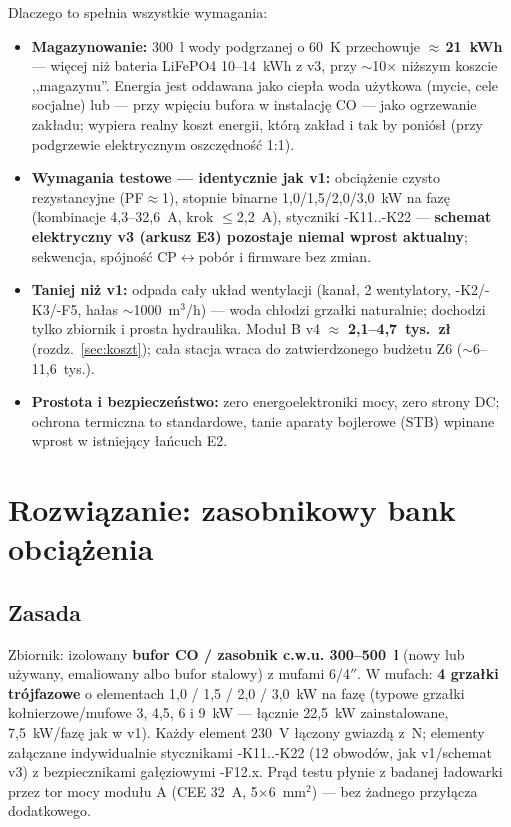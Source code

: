 \documentclass[11pt,a4paper]{article}
\begin{document}
Dlaczego to spełnia wszystkie wymagania:
\begin{itemize}
\item \textbf{Magazynowanie:} 300~l wody podgrzanej o 60~K przechowuje $\approx$\,\textbf{21~kWh}
--- więcej niż bateria LiFePO4 10--14~kWh z v3, przy $\sim$10$\times$ niższym koszcie ,,magazynu''.
Energia jest oddawana jako ciepła woda użytkowa (mycie, cele socjalne) lub --- przy wpięciu bufora
w instalację CO --- jako ogrzewanie zakładu; wypiera realny koszt energii, którą zakład i tak by
poniósł (przy podgrzewie elektrycznym oszczędność 1:1).
\item \textbf{Wymagania testowe --- identycznie jak v1:} obciążenie czysto rezystancyjne
(PF$\approx$1), stopnie binarne 1,0/1,5/2,0/3,0~kW na fazę (kombinacje 4,3--32,6~A, krok
$\le$2,2~A), styczniki -K11..-K22 --- \textbf{schemat elektryczny v3 (arkusz E3) pozostaje niemal
wprost aktualny}; sekwencja, spójność CP$\leftrightarrow$pobór i firmware bez zmian.
\item \textbf{Taniej niż v1:} odpada cały układ wentylacji (kanał, 2 wentylatory, -K2/-K3/-F5,
hałas $\sim$1000~m$^3$/h) --- woda chłodzi grzałki naturalnie; dochodzi tylko zbiornik i prosta
hydraulika. Moduł B v4 $\approx$ \textbf{2,1--4,7~tys.~zł} (rozdz.~\ref{sec:koszt}); cała stacja
wraca do zatwierdzonego budżetu Z6 ($\sim$6--11,6~tys.).
\item \textbf{Prostota i bezpieczeństwo:} zero energoelektroniki mocy, zero strony DC; ochrona
termiczna to standardowe, tanie aparaty bojlerowe (STB) wpinane wprost w istniejący łańcuch E2.
\end{itemize}

\section{Rozwiązanie: zasobnikowy bank obciążenia}
\subsection{Zasada}
Zbiornik: izolowany \textbf{bufor CO / zasobnik c.w.u. 300--500~l} (nowy lub używany, emaliowany
albo bufor stalowy) z mufami 6/4$''$. W mufach: \textbf{4 grzałki trójfazowe} o elementach
1,0 / 1,5 / 2,0 / 3,0~kW na fazę (typowe grzałki kołnierzowe/mufowe 3, 4,5, 6 i 9~kW --- łącznie
22,5~kW zainstalowane, 7,5~kW/fazę jak w v1). Każdy element 230~V łączony gwiazdą z~N; elementy
załączane indywidualnie stycznikami -K11..-K22 (12 obwodów, jak v1/schemat v3) z bezpiecznikami
gałęziowymi -F12.x. Prąd testu płynie z badanej ładowarki przez tor mocy modułu A (CEE 32~A,
5$\times$6~mm$^2$) --- bez żadnego przyłącza dodatkowego.
\end{document}
